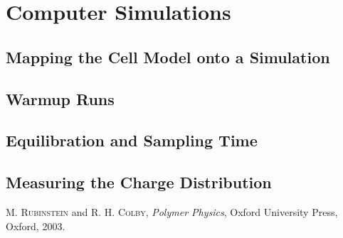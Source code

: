 \documentclass[a4paper,10pt,bibtotoc]{scrartcl}
\begin{document}
\section{Computer Simulations}
\subsection{Mapping the Cell Model onto a Simulation}
\subsection{Warmup Runs}
\subsection{Equilibration and Sampling Time}
\subsection{Measuring the Charge Distribution}

\begin{thebibliography}{9}
		
		\textsc{M. Rubinstein} and \textsc{R. H. Colby},
		\emph{Polymer Physics},
		Oxford University Press,
		Oxford,
		2003.


\end{thebibliography}
\end{document}
